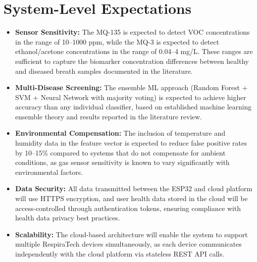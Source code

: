 \section{System-Level Expectations}
\begin{itemize}[leftmargin=1.5cm]
\item \textbf{Sensor Sensitivity:} The MQ-135 is expected to detect VOC concentrations in the range of 10--1000 ppm, while the MQ-3 is expected to detect ethanol/acetone concentrations in the range of 0.04--4 mg/L. These ranges are sufficient to capture the biomarker concentration differences between healthy and diseased breath samples documented in the literature.

\item \textbf{Multi-Disease Screening:} The ensemble ML approach (Random Forest + SVM + Neural Network with majority voting) is expected to achieve higher accuracy than any individual classifier, based on established machine learning ensemble theory and results reported in the literature review.

\item \textbf{Environmental Compensation:} The inclusion of temperature and humidity data in the feature vector is expected to reduce false positive rates by 10--15\% compared to systems that do not compensate for ambient conditions, as gas sensor sensitivity is known to vary significantly with environmental factors.

\item \textbf{Data Security:} All data transmitted between the ESP32 and cloud platform will use HTTPS encryption, and user health data stored in the cloud will be access-controlled through authentication tokens, ensuring compliance with health data privacy best practices.

\item \textbf{Scalability:} The cloud-based architecture will enable the system to support multiple RespiraTech devices simultaneously, as each device communicates independently with the cloud platform via stateless REST API calls.
\end{itemize}

